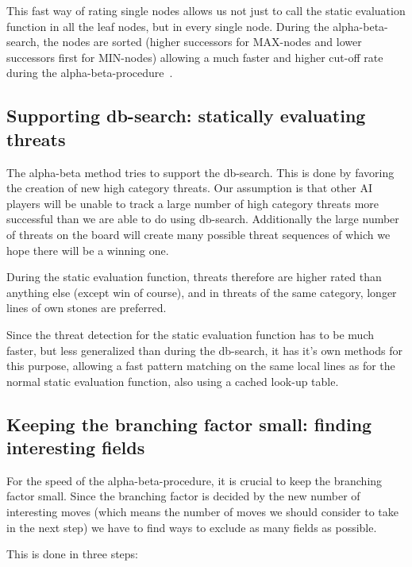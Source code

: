 \documentclass[10pt]{article}
\begin{document}
This fast way of rating single nodes allows us not just to call the static
evaluation function in all the leaf nodes, but in every single node. During the
alpha-beta-search, the nodes are sorted (higher successors for MAX-nodes and
lower successors first for MIN-nodes) allowing a much faster and higher cut-off
rate during the alpha-beta-procedure~\cite{Nilsson99}.

\subsection{Supporting db-search: statically evaluating threats}

The alpha-beta method tries to support the db-search.  This is done by
favoring the creation of new high category threats.  Our assumption is that
other AI players will be unable to track a large number of high category
threats more successful than we are able to do using db-search.  Additionally
the large number of threats on the board will create many possible threat
sequences of which we hope there will be a winning one.

During the static evaluation function, threats therefore are higher rated than
anything else (except win of course), and in threats of the same category,
longer lines of own stones are preferred.

Since the threat detection for the static evaluation function has to be much
faster, but less generalized than during the db-search, it has it's own methods
for this purpose, allowing a fast pattern matching on the same local lines as
for the normal static evaluation function, also using a cached look-up table.

\subsection{Keeping the branching factor small: finding interesting fields}

For the speed of the alpha-beta-procedure, it is crucial to keep the branching
factor small. Since the branching factor is decided by the new number of
interesting moves (which means the number of moves we should consider to take
in the next step) we have to find ways to exclude as many fields as possible.

This is done in three steps:
\end{document}
